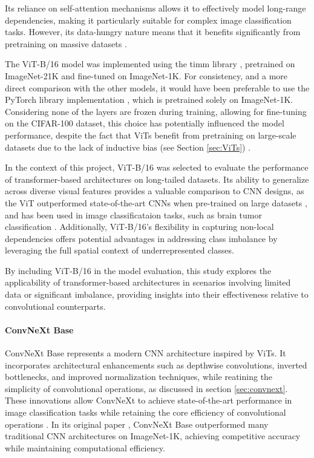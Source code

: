 Its reliance on self-attention mechanisms allows it to effectively model long-range dependencies, making it particularly suitable for complex image classification tasks. However, its data-hungry nature means that it benefits significantly from pretraining on massive datasets \cite{dosovitskiy2021imageworth16x16words}.

The ViT-B/16 model was implemented using the timm library \cite{huggingface2024vitbase}, pretrained on ImageNet-21K and fine-tuned on ImageNet-1K. For consistency, and a more direct comparison with the other models, it would have been preferable to use the PyTorch library implementation \cite{torchvision2024vitb16}, which is pretrained solely on ImageNet-1K. Considering none of the layers are frozen during training, allowing for fine-tuning on the CIFAR-100 dataset, this choice has potentially influenced the model performance, despite the fact that ViTs benefit from pretraining on large-scale datasets due to the lack of inductive bias (see Section \ref{sec:ViTs}) \cite{dosovitskiy2021imageworth16x16words,kolesnikov2020bigtransferbitgeneral} .

In the context of this project, ViT-B/16 was selected to evaluate the performance of transformer-based architectures on long-tailed datasets. Its ability to generalize across diverse visual features provides a valuable comparison to CNN designs, as the ViT outperformed state-of-the-art CNNs when pre-trained on large datasets \cite{dosovitskiy2021imageworth16x16words}, and has been used in image classificataion tasks, such as brain tumor classification \cite{asiri2023advancing}. Additionally, ViT-B/16's flexibility in capturing non-local dependencies offers potential advantages in addressing class imbalance by leveraging the full spatial context of underrepresented classes.

By including ViT-B/16 in the model evaluation, this study explores the applicability of transformer-based architectures in scenarios involving limited data or significant imbalance, providing insights into their effectiveness relative to convolutional counterparts.



\paragraph{ConvNeXt Base}
ConvNeXt Base \cite{liu2022convnet2020s} represents a modern CNN architecture inspired by ViTs. It incorporates architectural enhancements such as depthwise convolutions, inverted bottlenecks, and improved normalization techniques, while reatining the simplicity of convolutional operations, as discussed in section \ref{sec:convnext}. These innovations allow ConvNeXt to achieve state-of-the-art performance in image classification tasks while retaining the core efficiency of convolutional operations \cite{liu2022convnet2020s}. In its original paper \cite{liu2022convnet2020s}, ConvNeXt Base outperformed many traditional CNN architectures on ImageNet-1K, achieving competitive accuracy while maintaining computational efficiency. 


